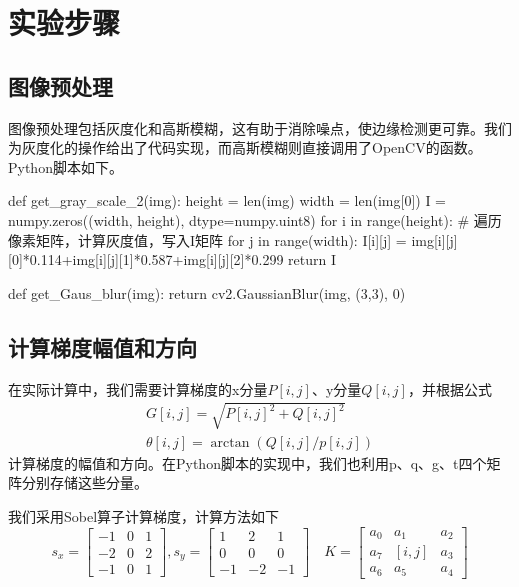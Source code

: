\documentclass{article}
\begin{document}
\section{实验步骤}

\subsection{图像预处理}

图像预处理包括灰度化和高斯模糊，这有助于消除噪点，使边缘检测更可靠。我们为灰度化的操作给出了代码实现，而高斯模糊则直接调用了OpenCV的函数。Python脚本如下。
\begin{python}
def get_gray_scale_2(img):
    height = len(img)
    width = len(img[0])
    I = numpy.zeros((width, height), dtype=numpy.uint8)
    for i in range(height):    # 遍历像素矩阵，计算灰度值，写入I矩阵
        for j in range(width):
            I[i][j] = img[i][j][0]*0.114+img[i][j][1]*0.587+img[i][j][2]*0.299
    return I
    
def get_Gaus_blur(img):
    return cv2.GaussianBlur(img, (3,3), 0)
\end{python}

\subsection{计算梯度幅值和方向}
在实际计算中，我们需要计算梯度的x分量$P[i,j]$、y分量$Q[i,j]$，并根据公式
\begin{equation}
\begin{array}{l}{G[i, j]=\sqrt{P[i, j]^{2}+Q[i, j]^{2}}} \\ {\theta[i, j]=\arctan (Q[i, j] / p[i, j])}\end{array}
\end{equation}
计算梯度的幅值和方向。在Python脚本的实现中，我们也利用p、q、g、t四个矩阵分别存储这些分量。

我们采用Sobel算子计算梯度，计算方法如下
$$
s_{x}=\left[\begin{array}{rrr}{-1} & {0} & {1} \\ {-2} & {0} & {2} \\ {-1} & {0} & {1}\end{array}\right], s_{y}=\left[\begin{array}{rrr}{1} & {2} & {1} \\ {0} & {0} & {0} \\ {-1} & {-2} & {-1}\end{array}\right] \quad K=\left[\begin{array}{ccc}{a_{0}} & {a_{1}} & {a_{2}} \\ {a_{7}} & {[i, j]} & {a_{3}} \\ {a_{6}} & {a_{5}} & {a_{4}}\end{array}\right]
$$
\end{document}

